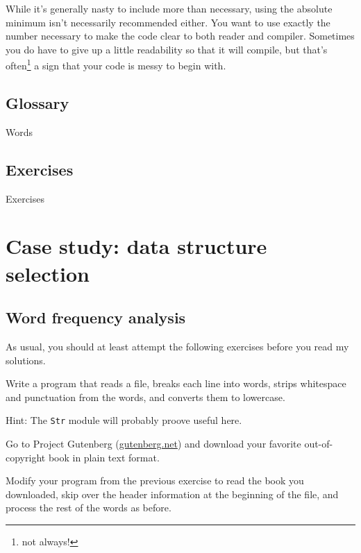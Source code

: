\documentclass[10pt]{book}
\begin{document}
{While it's generally nasty to include more than necessary, using the absolute minimum isn't necessarily recommended either. You want to use exactly the number necessary to make the code clear to both reader and compiler. Sometimes you do have to give up a little readability so that it will compile, but that's often\footnote{not always!} a sign that your code is messy to begin with.

\section{Glossary}

Words

\section{Exercises}

Exercises


\chapter{Case study: data structure selection}

\section{Word frequency analysis}
\label{analysis}

As usual, you should at least attempt the following exercises
before you read my solutions.

\begin{ex}
Write a program that reads a file, breaks each line into
words, strips whitespace and punctuation from the words, and
converts them to lowercase.


Hint: The {\tt Str} module will probably proove useful here.
\end{ex}


\begin{ex}


Go to Project Gutenberg (\url{gutenberg.net}) and download 
your favorite out-of-copyright book in plain text format.


Modify your program from the previous exercise to read the book
you downloaded, skip over the header information at the beginning
of the file, and process the rest of the words as before.


\end{ex}}
\end{document}
